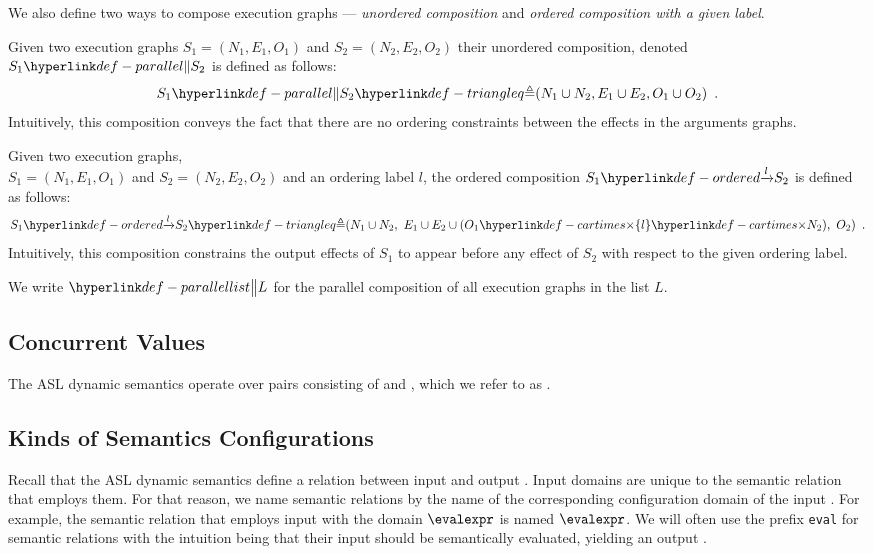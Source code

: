 We also define two ways to compose execution graphs --- \emph{unordered composition} and
\emph{ordered composition with a given label}.

\hypertarget{def-parallel}{}
\begin{definition}
Given two execution graphs $S_1 = (N_1, E_1, O_1)$ and $S_2 = (N_2, E_2, O_2)$ their unordered composition,
denoted $S_1 \parallelcomp S_2$ is defined as follows:
\[
  S_1 \parallelcomp S_2\triangleq (N_1 \cup N_2, E_1 \cup E_2, O_1 \cup O_2) \enspace.
\]
Intuitively, this composition conveys the fact that there are no ordering constraints between the effects
in the arguments graphs.
\end{definition}

\hypertarget{def-ordered}{}
\begin{definition}
Given two execution graphs, \\ $S_1 = (N_1, E_1, O_1)$ and $S_2 = (N_2, E_2, O_2)$ and an ordering label $l$,
the ordered composition $\ordered{S_1}{l}{S_2}$ is defined as follows:
\[
  \ordered{S_1}{l}{S_2} \triangleq (N_1 \cup N_2,\ E_1 \cup E_2 \cup (O_1 \cartimes \{l\} \cartimes N_2),\ O_2) \enspace.
\]
Intuitively, this composition constrains the output effects of $S_1$ to appear before any effect of $S_2$ with respect
to the given ordering label.

We write $\parallelgraphs{L}$ for the parallel composition of all execution graphs in the list $L$.
\end{definition}

\subsection{Concurrent Values\label{sec:ConcurrentValues}}
\hypertarget{def-concurrentnativevalue}{}
The ASL dynamic semantics operate over pairs consisting of \nativevaluesterm{} and \executiongraphsterm,
which we refer to as \concurrentnativevalues.

\subsection{Kinds of Semantics Configurations\label{sec:KindsOfSemanticsConfigurations}}

Recall that the ASL dynamic semantics define a relation between input \semanticsconfigurationsterm{} and output \semanticsconfigurationsterm{}.
Input \semanticsconfigurationterm{} domains are unique to the semantic relation that employs them.
For that reason, we name semantic relations by the name of the corresponding configuration domain of the input \semanticsconfigurationterm{}.
For example, the semantic relation that employs input \semanticsconfigurationsterm{} with the domain $\evalexpr$
is named $\evalexpr$.
%
We will often use the prefix \texttt{eval} for semantic relations with the intuition being that their input \semanticsconfigurationsterm{}
should be semantically evaluated, yielding an output \semanticsconfigurationterm{}.

